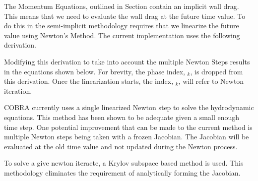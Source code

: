 The Momentum Equations, outlined in Section contain an implicit wall drag. This means that we need to evaluate the wall drag at the future time value.
To do this in the semi-implicit methodology requires that we linearize the future value using Newton's Method.
The current implementation uses the following derivation.

Modifying this derivation to take into account the multiple Newton Steps results in the equations shown below.
For brevity, the phase index, $_k$, is dropped from this derivation.
Once the linearization starts, the index, $_k$, will refer to Newton iteration.



COBRA currently uses a single linearized Newton step to solve the hydrodynamic equations.
This method has been shown to be adequate given a small enough time step.
One potential improvement that can be made to the current method is multiple Newton steps being taken with a frozen Jacobian.
The Jacobian will be evaluated at the old time value and not updated during the Newton process.


To solve a give newton iteraete, a Krylov subspace based method is used.
This methodology eliminates the requirement of analytically forming the Jacobian.